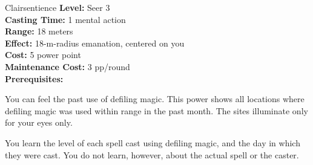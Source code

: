 {Clairsentience}
{
	\textbf{Level:}
	Seer 3\\
	\textbf{Casting Time:}
	1 mental action\\
	\textbf{Range:}
	18 meters\\
	\textbf{Effect:}
	18-m-radius emanation, centered on you\\
	\textbf{Cost:}
	5 power point\\
	\textbf{Maintenance Cost:}
	3 pp/round\\
	\textbf{Prerequisites:}
	\\
}
{
	You can feel the past use of defiling magic. This power shows all locations where defiling magic was used within range in the past month. The sites illuminate only for your eyes only.

	You learn the level of each spell cast using defiling magic, and the day in which they were cast. You do not learn, however, about the actual spell or the caster.
}